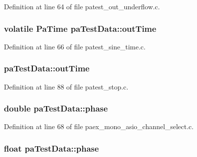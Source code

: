 Definition at line 64 of file patest\+\_\+out\+\_\+underflow.\+c.

\subsubsection[{\texorpdfstring{out\+Time}{outTime}}]{\setlength{\rightskip}{0pt plus 5cm}volatile {\bf Pa\+Time} pa\+Test\+Data\+::out\+Time}\hypertarget{structpa_test_data_a9e3239a2d641d8cea8c0a24a2cb01207}{}\label{structpa_test_data_a9e3239a2d641d8cea8c0a24a2cb01207}


Definition at line 66 of file patest\+\_\+sine\+\_\+time.\+c.

\subsubsection[{\texorpdfstring{out\+Time}{outTime}}]{ pa\+Test\+Data\+::out\+Time}\hypertarget{structpa_test_data_aa00087862e1fe0bf984a949cbb9b4263}{}\label{structpa_test_data_aa00087862e1fe0bf984a949cbb9b4263}


Definition at line 88 of file patest\+\_\+stop.\+c.

\subsubsection[{\texorpdfstring{phase}{phase}}]{\setlength{\rightskip}{0pt plus 5cm}double pa\+Test\+Data\+::phase}\hypertarget{structpa_test_data_a64605f187ec79bda1bcbcc818781d486}{}\label{structpa_test_data_a64605f187ec79bda1bcbcc818781d486}


Definition at line 68 of file paex\+\_\+mono\+\_\+asio\+\_\+channel\+\_\+select.\+c.

\subsubsection[{\texorpdfstring{phase}{phase}}]{\setlength{\rightskip}{0pt plus 5cm}float pa\+Test\+Data\+::phase}\hypertarget{structpa_test_data_a9a42e4b78f3d1dab0ce1f1e51f656cd3}{}\label{structpa_test_data_a9a42e4b78f3d1dab0ce1f1e51f656cd3}


